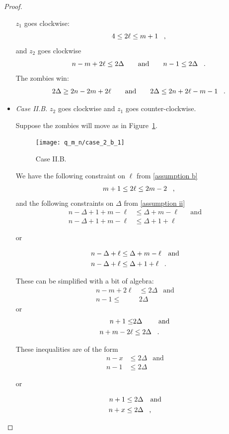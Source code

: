 \begin{proof}
\begin{proofpart}
\begin{itemize}
  $z_1$ goes clockwise:
  \[ 4 \leq 2 \ell \leq m + 1 \mcomma \]
  and $z_2$ goes clockwise
  \[ n -m + 2\ell \leq 2 \Delta \qquad \text{and} \qquad n-1 \leq 2 \Delta \mperiod \]
  The zombies win:
  \[ 2 \Delta \geq 2n - 2m + 2\ell \qquad \text{and} \qquad 2 \Delta \leq 2n + 2\ell - m - 1 \mperiod\]


  \item \textit{Case II.B.} $z_2$ goes clockwise and $z_1$ goes counter-clockwise.

  Suppose the zombies will move as in Figure~\ref{fig:case_2_b_1}.
  \begin{figure}
    \centering
    \texttt{[image: q\_m\_n/case\_2\_b\_1]}
    \caption{Case II.B. \label{fig:case_2_b_1}}
  \end{figure}

  We have the following constraint on $\ell$ from \ref{assumption b}
  \begin{align*}
   m + 1 \leq 2 \ell \leq 2m - 2 \mcomma
  \end{align*}
  and the following constraints on $\Delta$ from \ref{assumption ii}
  \begin{align*}
   n - \Delta + 1 + m - \ell &\leq \Delta + m - \ell && \text{and} \\
   n - \Delta + 1 + m - \ell &\leq \Delta + 1 + \ell
  \end{align*}
  \begin{center}or\end{center}
    \begin{align*}
     n - \Delta + \ell &\leq \Delta + m - \ell && \text{and} \\
     n - \Delta + \ell &\leq \Delta + 1 + \ell \mperiod
    \end{align*}

  These can be simplified with a bit of algebra:
  \begin{align*}
   n-m+2\ell &\leq 2 \Delta & \text{and} \\
   n-1 \leq       & 2\Delta
  \end{align*}
  or
  \begin{align*}
   n+1 \leq        & 2 \Delta & \text{and} \\
   n+m-2\ell  &\leq 2 \Delta \mperiod
  \end{align*}

  These inequalities are of the form
  \begin{align*}
   n-x &\leq 2 \Delta & \text{and} \\
   n-1 &\leq 2\Delta
  \end{align*}
  \begin{center}or\end{center}
  \begin{align*}
   n + 1 &\leq 2 \Delta & \text{and} \\
   n + x &\leq 2 \Delta \mcomma
  \end{align*}


\end{itemize}
\end{proofpart}
\end{proof}
